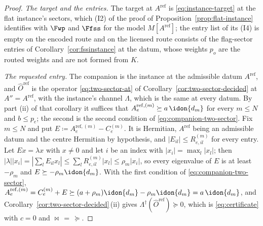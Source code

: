 \begin{proof}
\emph{The target and the entries.} The target at $A^{\mathrm{ref}}$ is
\eqref{eq:instance-target} at the flat instance's sectors, which (I2) of the
proof of Proposition~\ref{prop:flat-instance} identifies with $\Fwp$ and
$\Ffss$ for the model $M[A^{\mathrm{ref}}]$; the entry list of its (I4) is
empty on the encoded route and on the licensed route consists of the
flag-sector entries of Corollary~\ref{cor:fssinstance} at the datum, whose
weights $p_o$ are the routed weights and are not formed from $K$.

\emph{The requested entry.} The companion is the instance at the
admissible datum $A^{\mathrm{ref}}$, and $\hat O^{\mathrm{ref}}$ is the
operator \eqref{eq:two-sector-at} of Corollary~\ref{cor:two-sector-decided}
at $A''=A^{\mathrm{ref}}$, with the instance's channel $\Lambda$, which is
the same at every datum. By part (ii) of that corollary it suffices that
$A^{\mathrm{ref},(m)}_e\succeq a\,\idon{d_m}$ for every $m\le N$ and
$b\le p_e$; the second is the second condition of
\eqref{eq:companion-two-sector}. Fix $m\le N$ and put $E\coloneqq A^{\mathrm{ref},(m)}_e-C^{(m)}_e$. It is
Hermitian, $A^{\mathrm{ref}}$ being an admissible datum and the centre
Hermitian by hypothesis, and $|E_{il}|\le R^{(m)}_{e,il}$ for every entry.
Let $Ex=\lambda x$ with $x\ne0$ and let $i$ be an index with
$|x_i|=\max_l|x_l|$; then
$|\lambda||x_i|=|\sum_lE_{il}x_l|\le\sum_lR^{(m)}_{e,il}|x_l|\le\rho_m|x_i|$,
so every eigenvalue of $E$ is at least $-\rho_m$ and
$E\succeq-\rho_m\idon{d_m}$. With the first condition of
\eqref{eq:companion-two-sector},
$A^{\mathrm{ref},(m)}_e=C^{(m)}_e+E\succeq(a+\rho_m)\idon{d_m}-\rho_m\idon{d_m}
=a\,\idon{d_m}$, and Corollary~\ref{cor:two-sector-decided}\,(ii) gives
$\Lambda^{\dagger}(\hat O^{\mathrm{ref}})\succeq0$, which is
\eqref{eq:certificate} with $c=0$ and $\bowtie\,=\,\succeq$.
\end{proof}
